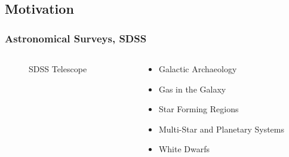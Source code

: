 \documentclass{beamer}
\begin{document}
\subsection{Motivation}
\begin{frame}
 	\frametitle{Astronomical Surveys, SDSS}
    \begin{columns}[onlytextwidth]
    \begin{column}{.45\textwidth}
        \begin{figure}
            \caption*{SDSS Telescope}
        \end{figure}
    \end{column}
    \hfill
    \begin{column}{.45\textwidth}
    \begin{itemize}
        \item Galactic Archaeology
        \item Gas in the Galaxy
        \item Star Forming Regions
        \item Multi-Star and Planetary Systems
        \item White Dwarfs
    \end{itemize}
    \end{column}
    \end{columns}
    \end{frame}
\end{document}
